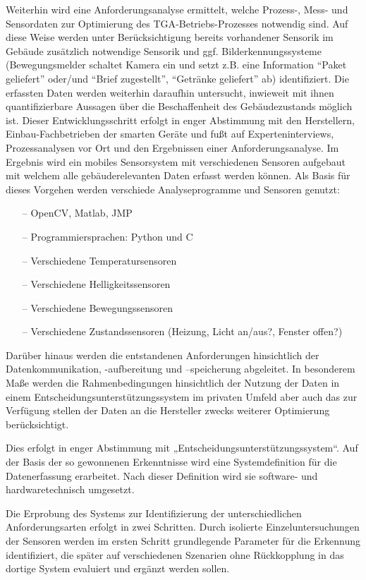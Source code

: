 Weiterhin wird eine Anforderungsanalyse ermittelt, welche Prozess-, Mess- und Sensordaten zur Optimierung des \gls{TGA}-Betriebs-Prozesses notwendig sind. Auf diese Weise werden unter Berücksichtigung bereits vorhandener Sensorik im Gebäude zusätzlich notwendige Sensorik und ggf. Bilderkennungssysteme (Bewegungsmelder schaltet Kamera ein und setzt z.B. eine Information \enquote{Paket geliefert} oder/und \enquote{Brief zugestellt}, \enquote{Getränke geliefert} ab) identifiziert. Die erfassten Daten werden weiterhin daraufhin untersucht, inwieweit mit ihnen quantifizierbare Aussagen über die Beschaffenheit des Gebäudezustands möglich ist. Dieser Entwicklungsschritt erfolgt in enger Abstimmung mit den Herstellern, Einbau-Fachbetrieben der smarten Geräte und fußt auf Experteninterviews, Prozessanalysen vor Ort und den Ergebnissen einer Anforderungsanalyse. Im Ergebnis wird ein mobiles Sensorsystem mit verschiedenen Sensoren aufgebaut mit welchem alle gebäuderelevanten Daten erfasst werden können. Als Basis für dieses Vorgehen werden verschiede Analyseprogramme und Sensoren genutzt:

\begin{itemize}
    \itemsep0em
    \item[--] OpenCV, Matlab, JMP
    \item[--] Programmiersprachen: Python und C
    \item[--] Verschiedene Temperatursensoren
    \item[--] Verschiedene Helligkeitssensoren
    \item[--] Verschiedene Bewegungssensoren
    \item[--] Verschiedene Zustandssensoren (Heizung, Licht an/aus?, Fenster offen?)
\end{itemize}

Darüber hinaus werden die entstandenen Anforderungen hinsichtlich der Datenkommunikation, -aufbereitung und –speicherung abgeleitet. In besonderem Maße werden die Rahmenbedingungen hinsichtlich der Nutzung der Daten in einem Entscheidungsunterstützungssystem im privaten Umfeld aber auch das zur Verfügung stellen der Daten an die Hersteller zwecks weiterer Optimierung berücksichtigt.

Dies erfolgt in enger Abstimmung mit „Entscheidungsunterstützungssystem“. Auf der Basis der so gewonnenen Erkenntnisse wird eine Systemdefinition für die Datenerfassung erarbeitet. Nach dieser Definition wird sie software- und hardwaretechnisch umgesetzt.

Die Erprobung des Systems zur Identifizierung der unterschiedlichen Anforderungsarten erfolgt in zwei Schritten. Durch isolierte Einzeluntersuchungen der Sensoren werden im ersten Schritt grundlegende Parameter für die Erkennung identifiziert, die später auf verschiedenen Szenarien ohne Rückkopplung in das dortige System evaluiert und ergänzt werden sollen.

